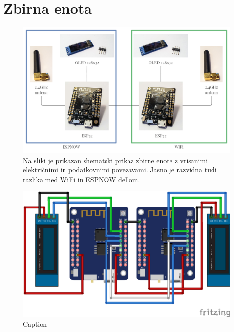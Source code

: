\documentclass[a4paper, 12pt]{book}
\begin{document}
\section{Zbirna enota}



\begin{figure}[H]
    \centering
    \includegraphics[width=\linewidth]{slikovno_gradivo/Zbirna enota shematski prikaz.png}
    \caption{Na sliki je prikazan shematski prikaz zbirne enote z vrisanimi električnimi in podatkovnimi povezavami. Jasno je razvidna tudi razlika med WiFi in ESPNOW dellom.}
    \label{fig:shema_zbirna}
\end{figure}


\begin{figure}[H]
    \centering
    \includegraphics[width=\linewidth]{slikovno_gradivo/zbirna_enota_bb.png}
    \caption{Caption}
    \label{fig:INMP441}
\end{figure}
\end{document}
